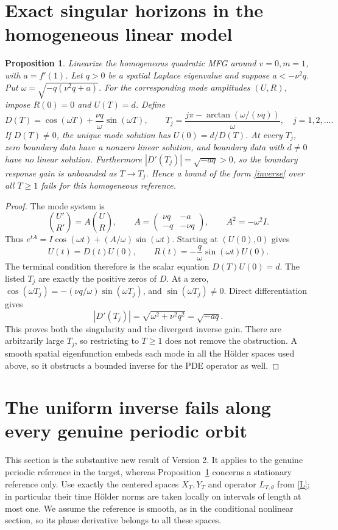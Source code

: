 \documentclass[11pt]{article}
\newtheorem{proposition}[theorem]{Proposition}
\begin{document}
\section{Exact singular horizons in the homogeneous linear model}
\begin{proposition}\label{resonant}
Linearize the homogeneous quadratic MFG around $v=0,m=1$, with
$a=f'(1)$. Let $q>0$ be a spatial Laplace eigenvalue and suppose
$a<-\nu^2q$. Put $\omega=\sqrt{-q(\nu^2q+a)}$.
For the corresponding mode amplitudes $(U,R)$, impose $R(0)=0$ and
$U(T)=d$. Define
\[
 D(T)=\cos(\omega T)+\frac{\nu q}{\omega}\sin(\omega T),\qquad
 T_j=\frac{j\pi-\arctan(\omega/(\nu q))}{\omega},\quad j=1,2,\ldots.
\]
If $D(T)\ne0$, the unique mode solution has $U(0)=d/D(T)$.
At every $T_j$, zero boundary data have a nonzero linear solution,
and boundary data with $d\ne0$ have no linear solution.
Furthermore $|D'(T_j)|=\sqrt{-aq}>0$, so the boundary response gain
is unbounded as $T\to T_j$. Hence a bound of the form
\eqref{inverse} over all $T\geq1$ fails for this homogeneous reference.
\end{proposition}
\begin{proof}
The mode system is
\[
 \binom{U'}{R'}=
 A\binom U R,\qquad
 A=\begin{pmatrix}\nu q&-a\\-q&-\nu q\end{pmatrix},
 \qquad A^2=-\omega^2 I.
\]
Thus $e^{tA}=I\cos(\omega t)+(A/\omega)\sin(\omega t)$.
Starting at $(U(0),0)$ gives
\[
 U(t)=D(t)U(0),\qquad R(t)=-\frac q\omega\sin(\omega t)U(0).
\]
The terminal condition therefore is the scalar equation $D(T)U(0)=d$.
The listed $T_j$ are exactly the positive zeros of $D$.
At a zero, $\cos(\omega T_j)=-(\nu q/\omega)\sin(\omega T_j)$,
and $\sin(\omega T_j)\ne0$. Direct differentiation gives
\[
 |D'(T_j)|=\sqrt{\omega^2+\nu^2q^2}=\sqrt{-aq}.
\]
This proves both the singularity and the divergent inverse gain.
There are arbitrarily large $T_j$, so restricting to $T\geq1$ does
not remove the obstruction. A smooth spatial eigenfunction embeds each
mode in all the H\"older spaces used above, so it obstructs a bounded
inverse for the PDE operator as well.
\end{proof}


\section{The uniform inverse fails along every genuine periodic orbit}
This section is the substantive new result of Version 2. It applies to
the genuine periodic reference in the target, whereas
Proposition~\ref{resonant} concerns a stationary reference only.
Use exactly the centered spaces $X_T,Y_T$ and operator
$L_{T,\theta}$ from \eqref{L}; in particular their time H\"older norms
are taken locally on intervals of length at most one.
We assume the reference is smooth, as in the conditional nonlinear
section, so its phase derivative belongs to all these spaces.
\end{document}
